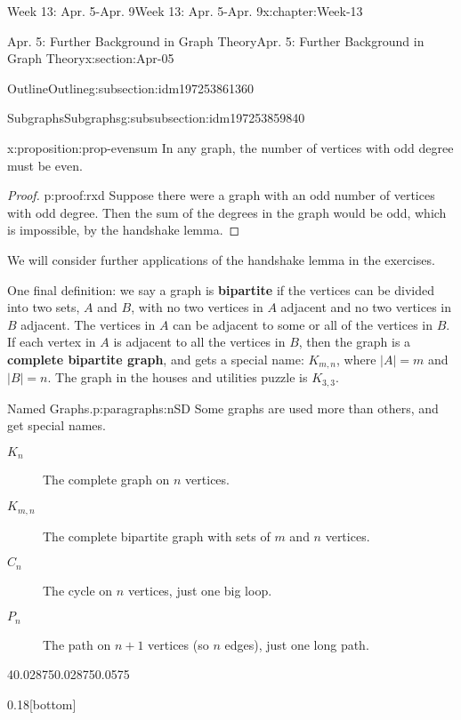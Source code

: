 \documentclass[oneside,10pt,]{book}
\newcommand{\terminology}[1]{\textbf{#1}}
\numberwithin{equation}{section}
\begin{document}
\begin{chapterptx}{Week 13: Apr. 5-Apr. 9}{}{Week 13: Apr. 5-Apr. 9}{}{}{x:chapter:Week-13}
\begin{sectionptx}{Apr. 5: Further Background in Graph Theory}{}{Apr. 5: Further Background in Graph Theory}{}{}{x:section:Apr-05}
\begin{subsectionptx}{Outline}{}{Outline}{}{}{g:subsection:idm197253861360}
\begin{subsubsectionptx}{Subgraphs}{}{Subgraphs}{}{}{g:subsubsection:idm197253859840}
\begin{proposition}{}{}{x:proposition:prop-evensum}%
In any graph, the number of vertices with odd degree must be even.%
\end{proposition}
\begin{proof}{}{p:proof:rxd}
Suppose there were a graph with an odd number of vertices with odd degree.  Then the sum of the degrees in the graph would be odd, which is impossible, by the handshake lemma.%
\end{proof}
We will consider further applications of the handshake lemma in the exercises.%
\par
{} One final definition: we say a graph is \terminology{bipartite} if the vertices can be divided into two sets, \(A\) and \(B\), with no two vertices in \(A\) adjacent and no two vertices in \(B\) adjacent. The vertices in \(A\) can be adjacent to some or all of the vertices in \(B\). If each vertex in \(A\) is adjacent to all the vertices in \(B\), then the graph is a \terminology{complete bipartite graph}, and gets a special name: \(K_{m,n}\), where \(|A| = m\) and \(|B| = n\). The graph in the houses and utilities puzzle is \(K_{3,3}\).%
\begin{paragraphs}{Named Graphs.}{p:paragraphs:nSD}%
%
%
%
%
%
%
%
%
Some graphs are used more than others, and get special names.%
\begin{description}
\item[{\(K_n\)}]The complete graph on \(n\) vertices. \label{g:notation:idm197253785296}%
\item[{\(K_{m,n}\)}]The complete bipartite graph with sets of \(m\) and \(n\) vertices. \label{g:notation:idm197253781456}%
\item[{\(C_n\)}]The cycle on \(n\) vertices, just one big loop. \label{g:notation:idm197253777504}%
\item[{\(P_n\)}]The path on \(n+1\) vertices (so \(n\) edges), just one long path. \label{g:notation:idm197253773328}%
\end{description}
%
\begin{sidebyside}{4}{0.02875}{0.02875}{0.0575}%
\begin{sbspanel}{0.18}[bottom]%
\resizebox{\linewidth}{!}{%
				\begin{tikzpicture}[scale=1]

\end{tikzpicture}}
\end{sbspanel}
\end{sidebyside}
\end{paragraphs}
\end{subsubsectionptx}
\end{subsectionptx}
\end{sectionptx}
\end{chapterptx}
\end{document}
